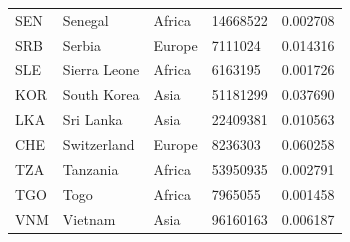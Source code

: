 \documentclass[11pt]{report}
\begin{document}
\begin{table}[h!]
\begin{tabular}{lllll}
            SEN                           & Senegal                   & Africa                         & 14668522                      & 0.002708                           \\
            SRB                           & Serbia                    & Europe                         & 7111024                       & 0.014316                           \\
            SLE                           & Sierra Leone              & Africa                         & 6163195                       & 0.001726                           \\
            KOR                           & South Korea               & Asia                           & 51181299                      & 0.037690                           \\
            LKA                           & Sri Lanka                 & Asia                           & 22409381                      & 0.010563                           \\
            CHE                           & Switzerland               & Europe                         & 8236303                       & 0.060258                           \\
            TZA                           & Tanzania                  & Africa                         & 53950935                      & 0.002791                           \\
            TGO                           & Togo                      & Africa                         & 7965055                       & 0.001458                           \\
            VNM                           & Vietnam                   & Asia                           & 96160163                      & 0.006187
        \end{tabular}
    \end{table}
\end{document}
